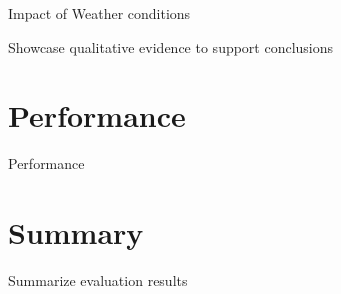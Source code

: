 Impact of Weather conditions

Showcase qualitative evidence to support conclusions

\newpage


\section{Performance}
\label{sec:performance}

Performance


\section{Summary}
\label{sec:summary}

Summarize evaluation results

